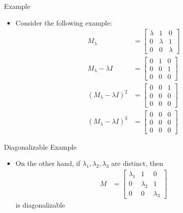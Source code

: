 \documentclass[usenames,dvipsnames,10pt]{beamer}
\begin{document}
\begin{frame}
  {Example}

  \begin{itemize}
  \item Consider the following example:
    \begin{align*}
      M_\lambda &=
                  \begin{bmatrix}
                    \lambda & 1 & 0 \\ 0 & \lambda & 1 \\ 0 & 0 & \lambda
                  \end{bmatrix}\\
      M_\lambda-\lambda I
                &=
                  \begin{bmatrix}
                    0 & 1 & 0 \\ 0 & 0 & 1 \\ 0 & 0 & 0
                  \end{bmatrix}\\
      (M_\lambda-\lambda I)^2 &= 
                                \begin{bmatrix}
                                  0 & 0 & 1 \\ 0 & 0 & 0 \\ 0 & 0 & 0
                                \end{bmatrix}\\
      (M_\lambda-\lambda I)^3 &=
                                \begin{bmatrix}
                                  0 & 0 & 0 \\ 0 & 0 & 0 \\ 0 & 0 & 0
                                \end{bmatrix}
    \end{align*}
  \end{itemize}
\end{frame}
\begin{frame}
  {Diagonalizable Example}

  \begin{itemize}
  \item On the other hand, if $\lambda_1,\lambda_2,\lambda_3$ are distinct, then
    \begin{align*}
      M &=
          \begin{bmatrix}
            \lambda_1 & 1 & 0 \\ 0 & \lambda_2 & 1 \\ 0 & 0 & \lambda_3
          \end{bmatrix}
    \end{align*}
    is diagonalizable
  \end{itemize}
\end{frame}
\end{document}
